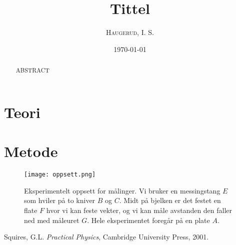 \documentclass[%
 reprint,
 amsmath,amssymb,
 aps,
]{revtex4-1}
\begin{document}

\title{Tittel}%

\author{\textsc{Haugerud, I. S.}}
%

\date{\today}%

\begin{abstract}
ABSTRACT
\end{abstract}

\maketitle


\section{\label{sec:level1}Teori}

\section{\label{sec:level1}Metode}

\begin{figure}[h!]
  \centering
  \texttt{[image: oppsett.png]}
  \caption{Eksperimentelt oppsett for målinger. Vi bruker en messingstang $E$ som hviler på to kniver $B$ og $C$. Midt på bjelken er det festet en flate $F$ hvor vi kan feste vekter, og vi kan måle avstanden den faller ned med måleuret $G$. Hele eksperimentet foregår på en plate $A$.}
  \label{eksp}
\end{figure}

\begin{thebibliography}{9}


Squires, G.L. \emph{Practical Physics}, Cambridge University Press, 2001.



 \end{thebibliography}
\end{document}
